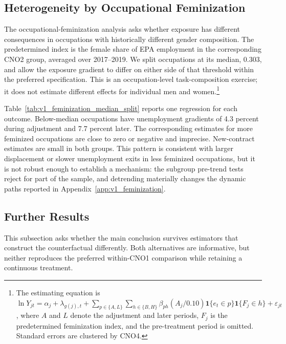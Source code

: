 \documentclass[11pt]{article}
\begin{document}
\subsection{Heterogeneity by Occupational Feminization}
\label{sec:v1_feminization}

The occupational-feminization analysis asks whether exposure has different consequences in occupations with historically different gender composition. The predetermined index is the female share of EPA employment in the corresponding CNO2 group, averaged over 2017--2019. We split occupations at its median, 0.303, and allow the exposure gradient to differ on either side of that threshold within the preferred specification. This is an occupation-level task-composition exercise; it does not estimate different effects for individual men and women.\footnote{The estimating equation is \(\ln Y_{jt}=\alpha_j+\lambda_{g(j),t}+\sum_{p\in\{A,L\}}\sum_{h\in\{B,H\}}\beta_{ph}(A_j/0.10)\mathbf{1}\{e_t\in p\}\mathbf{1}\{F_j\in h\}+\varepsilon_{jt}\), where \(A\) and \(L\) denote the adjustment and later periods, \(F_j\) is the predetermined feminization index, and the pre-treatment period is omitted. Standard errors are clustered by CNO4.}



Table~\ref{tab:v1_feminization_median_split} reports one regression for each outcome. Below-median occupations have unemployment gradients of 4.3 percent during adjustment and 7.7 percent later. The corresponding estimates for more feminized occupations are close to zero or negative and imprecise. New-contract estimates are small in both groups. This pattern is consistent with larger displacement or slower unemployment exits in less feminized occupations, but it is not robust enough to establish a mechanism: the subgroup pre-trend tests reject for part of the sample, and detrending materially changes the dynamic paths reported in Appendix~\ref{app:v1_feminization}.

\subsection{Further Results}
\label{sec:v1_further}

This subsection asks whether the main conclusion survives estimators that construct the counterfactual differently. Both alternatives are informative, but neither reproduces the preferred within-CNO1 comparison while retaining a continuous treatment.
\end{document}
